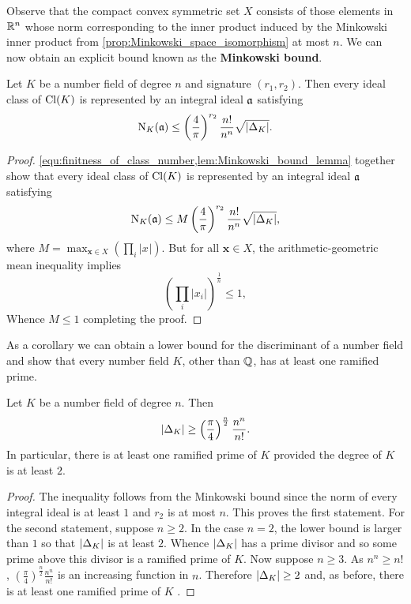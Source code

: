     Observe that the compact convex symmetric set \(X\) consists of those elements in \(\mathbb{R}^{n}\) whose norm corresponding to the inner product induced by the Minkowski inner product from \cref{prop:Minkowski_space_isomorphism} at most \(n\). We can now obtain an explicit bound known as the \textbf{Minkowski bound}.

    \begin{theorem*}
      Let \(K\) be a number field of degree \(n\) and signature \((r_{1},r_{2})\). Then every ideal class of \(\operatorname{\mathrm{Cl}}(K)\) is represented by an integral ideal \(\mathfrak{a}\) satisfying
      \[
        \operatorname{\mathrm{N}}_{K}(\mathfrak{a}) \le \left(\frac{4}{\pi}\right)^{r_{2}}\frac{n!}{n^{n}}\sqrt{|\Delta_{K}|}.
      \]
    \end{theorem*}
    \begin{proof}
      \cref{equ:finitness_of_class_number,lem:Minkowski_bound_lemma} together show that every ideal class of \(\operatorname{\mathrm{Cl}}(K)\) is represented by an integral ideal \(\mathfrak{a}\) satisfying
      \[
        \operatorname{\mathrm{N}}_{K}(\mathfrak{a}) \le M\left(\frac{4}{\pi}\right)^{r_{2}}\frac{n!}{n^{n}}\sqrt{|\Delta_{K}|},
      \]
      where \(M = \max_{\mathbf{x} \in X}\left(\prod_{i}|x_{}|\right)\). But for all \(\mathbf{x} \in X\), the arithmetic-geometric mean inequality implies
      \[
        \left(\prod_{i}|x_{i}|\right)^{\frac{1}{n}} \le 1,
      \]
      Whence \(M \le 1\) completing the proof.
    \end{proof}

    As a corollary we can obtain a lower bound for the discriminant of a number field and show that every number field \(K\), other than \(\mathbb{Q}\), has at least one ramified prime.

    \begin{corollary}
      Let \(K\) be a number field of degree \(n\). Then
      \[
        |\Delta_{K}| \ge \left(\frac{\pi}{4}\right)^{\frac{n}{2}}\frac{n^{n}}{n!}.
      \]
      In particular, there is at least one ramified prime of \(K\) provided the degree of \(K\) is at least \(2\). 
    \end{corollary}
    \begin{proof}
      The inequality follows from the Minkowski bound since the norm of every integral ideal is at least \(1\) and \(r_{2}\) is at most \(n\). This proves the first statement. For the second statement, suppose \(n \ge 2\). In the case \(n = 2\), the lower bound is larger than \(1\) so that \(|\Delta_{K}|\) is at least \(2\). Whence \(|\Delta_{K}|\) has a prime divisor and so some prime above this divisor is a ramified prime of \(K\). Now suppose \(n \ge 3\). As \(n^{n} \ge n!\), \(\left(\frac{\pi}{4}\right)^{\frac{n}{2}}\frac{n^{n}}{n!}\) is an increasing function in \(n\). Therefore \(|\Delta_{K}| \ge 2\) and, as before, there is at least one ramified prime of \(K\) .
    \end{proof}

